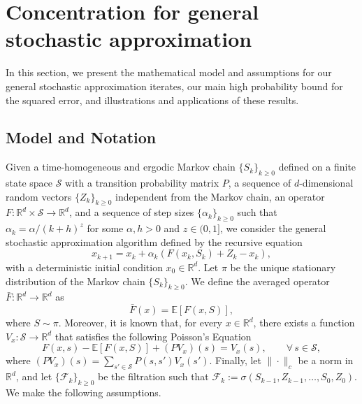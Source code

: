 \documentclass{article}
\newcommand{\lrp}[1]{\left( #1 \right)}
\newcommand{\lrs}[1]{\left[ #1 \right]}
\newcommand{\E}[1]{\mathbb{E}\lrs{#1}}
\newcommand{\R}{\mathbb{R}}
\newcommand{\calS}{{\mathcal S}}
\begin{document}
\section{Concentration for general stochastic approximation}\label{sec:boundednoise}
In this section, we present the mathematical model and assumptions for our general stochastic approximation iterates, our main high probability bound for the squared error, and illustrations and applications of these results. 



\subsection{Model and Notation}\label{sec:model}
Given a time-homogeneous and ergodic Markov chain $\{S_k\}_{k\geq 0}$ defined on a finite state space $\mathcal S$ with a transition probability matrix $P$, a sequence of $d$-dimensional random vectors $\{Z_k\}_{k\geq 0}$ independent from the Markov chain, an operator $F:\R^d\times \calS \rightarrow \R^d$, and a sequence of step sizes $\{\alpha_k\}_{k\geq 0}$ such that $\alpha_k = \alpha/(k+h)^z$ for some $\alpha, h>0$ and $z\in(0,1]$, we consider the general stochastic approximation algorithm defined by the recursive equation
\begin{equation}\label{eq:SAalgo}
    x_{k+1} = x_k + \alpha_k \lrp{ F(x_k, S_k) + Z_k - x_k },
\end{equation}
with a deterministic initial condition $x_0\in \mathbb{R}^d$.
Let $\pi$ be the unique stationary distribution of the Markov chain $\{S_k\}_{k\geq 0}$. We define the averaged operator $\bar{F}: \R^d \rightarrow \R^d$ as
\[ \bar{F}(x) = \E{ F(x,S)}, \]
where $S\sim \pi$. Moreover, it is known \citep[Section 21.2]{douc2018markov} that, for every $x\in\mathbb{R}^d$, there exists a function $V_x:\mathcal{S}\to\R^d$ that satisfies the following Poisson's Equation
\begin{equation}\label{eq:PE}
F(x, s)  - \E{F(x,S)} + (PV_x)(s) = V_x(s), \qquad \forall\, s\in \mathcal{S}, 
\end{equation}
where $(PV_x)(s)= \sum_{s'\in\mathcal S} P(s,s') V_x(s')$. Finally, let $\|\cdot\|_c$ be a norm in $\R^d$, and let $\{\mathcal{F}_k\}_{k\geq 0}$ be the filtration such that $\mathcal F_k := \sigma(S_{k-1}, Z_{k-1}, \dots, S_0, Z_0)$. %
We make the following assumptions.
\end{document}
